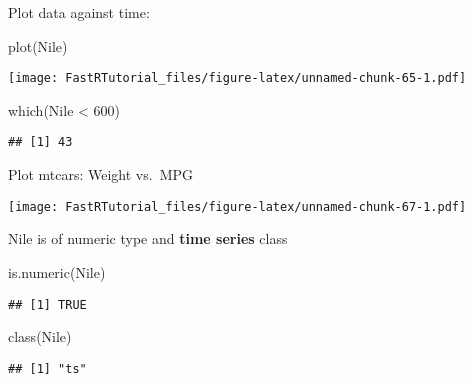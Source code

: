 \documentclass[
]{article}
\newenvironment{Shaded}{\begin{snugshade}}{\end{snugshade}}
\newcommand{\DecValTok}[1]{\textcolor[rgb]{0.00,0.00,0.81}{#1}}
\newcommand{\FunctionTok}[1]{\textcolor[rgb]{0.00,0.00,0.00}{#1}}
\newcommand{\NormalTok}[1]{#1}
\newcommand{\SpecialCharTok}[1]{\textcolor[rgb]{0.00,0.00,0.00}{#1}}
\begin{document}
Plot data against time:

\begin{Shaded}
\begin{Highlighting}[]
\FunctionTok{plot}\NormalTok{(Nile)}
\end{Highlighting}
\end{Shaded}

\texttt{[image: FastRTutorial\_files/figure-latex/unnamed-chunk-65-1.pdf]}

\begin{Shaded}
\begin{Highlighting}[]
\FunctionTok{which}\NormalTok{(Nile }\SpecialCharTok{\textless{}} \DecValTok{600}\NormalTok{)}
\end{Highlighting}
\end{Shaded}

\begin{verbatim}
## [1] 43
\end{verbatim}

Plot mtcars: Weight vs.~MPG

\begin{Shaded}
\end{Shaded}

\texttt{[image: FastRTutorial\_files/figure-latex/unnamed-chunk-67-1.pdf]}

Nile is of numeric type and \textbf{time series} class

\begin{Shaded}
\begin{Highlighting}[]
\FunctionTok{is.numeric}\NormalTok{(Nile)}
\end{Highlighting}
\end{Shaded}

\begin{verbatim}
## [1] TRUE
\end{verbatim}

\begin{Shaded}
\begin{Highlighting}[]
\FunctionTok{class}\NormalTok{(Nile)}
\end{Highlighting}
\end{Shaded}

\begin{verbatim}
## [1] "ts"
\end{verbatim}
\end{document}
